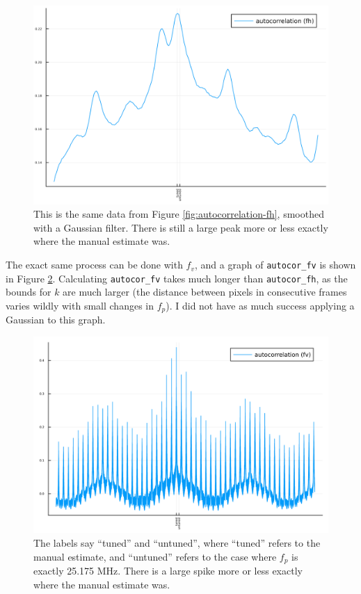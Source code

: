 \documentclass{article}
\newcommand*{\code}[1]{\texttt{#1}}
\begin{document}
\begin{figure}
    \centering
    \includegraphics[width=\linewidth]{images/autocor_fh_smooth.png}
    \caption{This is the same data from Figure \ref{fig:autocorrelation-fh}, smoothed with a Gaussian filter. There is still a large peak more or less exactly where the manual estimate was.}
    \label{fig:autocorrelation-fh-smooth}
\end{figure}

The exact same process can be done with $f_v$, and a graph of \code{autocor_fv} is shown in Figure \ref{fig:autocorrelation-fv}. Calculating \code{autocor_fv} takes much longer than \code{autocor_fh}, as the bounds for $k$ are much larger (the distance between pixels in consecutive frames varies wildly with small changes in $f_p$). I did not have as much success applying a Gaussian to this graph.

\begin{figure}
    \centering
    \includegraphics[width=\linewidth]{images/hi_res_autocor_fv.png}
    \caption{The labels say ``tuned'' and ``untuned'', where ``tuned'' refers to the manual estimate, and ``untuned'' refers to the case where $f_p$ is exactly 25.175 MHz. There is a large spike more or less exactly where the manual estimate was.}
    \label{fig:autocorrelation-fv}
\end{figure}
\end{document}
